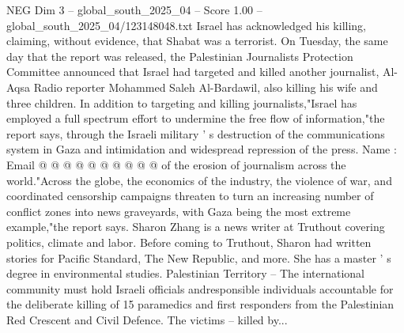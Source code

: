 \begin{textsample}{NEG Dim 3 – global\_south\_2025\_04 – Score 1.00 – global\_south\_2025\_04/123148048.txt}
Israel has acknowledged his killing, claiming, without evidence, that Shabat was a terrorist.
On Tuesday, the same day that the report was released, the Palestinian Journalists Protection Committee announced that Israel had targeted and killed another journalist, Al-Aqsa Radio reporter Mohammed Saleh Al-Bardawil, also killing his wife and three children.
In addition to targeting and killing journalists,"Israel has employed a full spectrum effort to undermine the free flow of information,"the report says, through the Israeli military ' s destruction of the communications system in Gaza and intimidation and widespread repression of the press.
Name : Email @ @ @ @ @ @ @ @ @ @ of the erosion of journalism across the world."Across the globe, the economics of the industry, the violence of war, and coordinated censorship campaigns threaten to turn an increasing number of conflict zones into news graveyards, with Gaza being the most extreme example,"the report says.
Sharon Zhang is a news writer at Truthout covering politics, climate and labor.
Before coming to Truthout, Sharon had written stories for Pacific Standard, The New Republic, and more.
She has a master ' s degree in environmental studies.
Palestinian Territory -- The international community must hold Israeli officials andresponsible individuals accountable for the deliberate killing of 15 paramedics and first responders from the Palestinian Red Crescent and Civil Defence.
The victims -- killed by...

\end{textsample}
